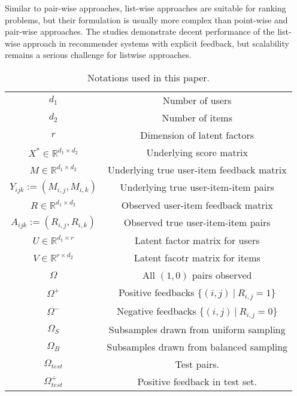 \documentclass{article}
\numberwithin{equation}{section}
\newcommand{\R}{\mathbb{R}}
\newtheorem{sampling strategy}{Sampling Strategy}
\begin{document}
Similar to pair-wise approaches, list-wise approaches are suitable for ranking problems, but their formulation is usually more complex than point-wise and pair-wise approaches. The studies  \cite{listwise,listcollaborativefiltering} demonstrate
decent performance of the list-wise approach in recommender systems with explicit feedback, but  scalability remains a serious challenge for listwise approaches.  
\begin{table}[t!]
    \scriptsize
    \centering
    \begin{tabular}{|c|c|} \hline
        $d_1$ & Number of users \\
        $d_2$ & Number of items \\
        $r$ & Dimension of latent factors \\
        $X^* \in \R^{d_1 \times d_2}$ & Underlying score matrix \\
        $M \in \R^{d_1 \times d_2} $ & Underlying true user-item feedback matrix \\
        $Y_{ijk} := (M_{i,j}, M_{i,k})$ & Underlying true user-item-item pairs \\ 
        $R \in \R^{d_1 \times d_2}$ & Observed user-item feedback matrix \\
        $A_{ijk} := (R_{i,j}, R_{i,k})$ & Observed true user-item-item pairs \\ 
        $U \in \R^{d_1 \times r}$ & Latent factor matrix for users \\
        $V \in \R^{r \times d_2}$ & Latent facotr matrix for items \\
        $\Omega$ & All $(1,0)$ pairs observed \\
        $\Omega^+$ & Positive feedbacks $\{(i,j) ~|~ R_{i,j} = 1\}$ \\
        $\Omega^-$ & Negative feedbacks $\{(i,j) ~|~ R_{i,j} = 0\}$ \\
        $\Omega_S$ & Subsamples drawn from uniform sampling \\ 
        $\Omega_B$ & Subsamples drawn from balanced sampling \\
        $\Omega_{test}$ & Test pairs. \\
        $\Omega_{test}^+$ & Positive feedback in test set. \\
        \hline
    \end{tabular}
    \caption{Notations used in this paper. }
    \label{tab:notations}
\end{table}
\end{document}
